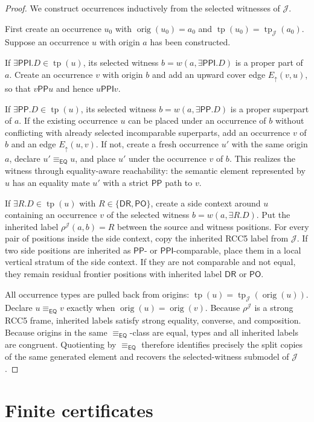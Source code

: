\documentclass[11pt]{article}
\newcommand{\EQ}{\mathsf{EQ}}
\newcommand{\DR}{\mathsf{DR}}
\newcommand{\PO}{\mathsf{PO}}
\newcommand{\PP}{\mathsf{PP}}
\newcommand{\PPI}{\mathsf{PPI}}
\newcommand{\J}{\mathcal J}
\newcommand{\typ}{\operatorname{tp}}
\newcommand{\orig}{\operatorname{orig}}
\newcommand{\eqc}{\equiv_{\EQ}}
\begin{document}
\begin{proof}
We construct occurrences inductively from the selected witnesses of $\J$.

First create an occurrence $u_0$ with $\orig(u_0)=a_0$ and $\typ(u_0)=\typ_\J(a_0)$.  Suppose an occurrence $u$ with origin $a$ has been constructed.

If $\exists\PPI.D\in\typ(u)$, its selected witness $b=w(a,\exists\PPI.D)$ is a proper part of $a$.  Create an occurrence $v$ with origin $b$ and add an upward cover edge $E_\uparrow(v,u)$, so that $v\PP u$ and hence $u\PPI v$.

If $\exists\PP.D\in\typ(u)$, its selected witness $b=w(a,\exists\PP.D)$ is a proper superpart of $a$.  If the existing occurrence $u$ can be placed under an occurrence of $b$ without conflicting with already selected incomparable superparts, add an occurrence $v$ of $b$ and an edge $E_\uparrow(u,v)$.  If not, create a fresh occurrence $u'$ with the same origin $a$, declare $u'\eqc u$, and place $u'$ under the occurrence $v$ of $b$.  This realizes the witness through equality-aware reachability: the semantic element represented by $u$ has an equality mate $u'$ with a strict $\PP$ path to $v$.

If $\exists R.D\in\typ(u)$ with $R\in\{\DR,\PO\}$, create a side context around $u$ containing an occurrence $v$ of the selected witness $b=w(a,\exists R.D)$.  Put the inherited label $\rho^\J(a,b)=R$ between the source and witness positions.  For every pair of positions inside the side context, copy the inherited RCC5 label from $\J$.  If two side positions are inherited as $\PP$- or $\PPI$-comparable, place them in a local vertical stratum of the side context.  If they are not comparable and not equal, they remain residual frontier positions with inherited label $\DR$ or $\PO$.

All occurrence types are pulled back from origins: $\typ(u)=\typ_\J(\orig(u))$.  Declare $u\eqc v$ exactly when $\orig(u)=\orig(v)$.  Because $\rho^\J$ is a strong RCC5 frame, inherited labels satisfy strong equality, converse, and composition.  Because origins in the same $\eqc$-class are equal, types and all inherited labels are congruent.  Quotienting by $\eqc$ therefore identifies precisely the split copies of the same generated element and recovers the selected-witness submodel of $\J$.
\end{proof}

\section{Finite certificates}
\end{document}
